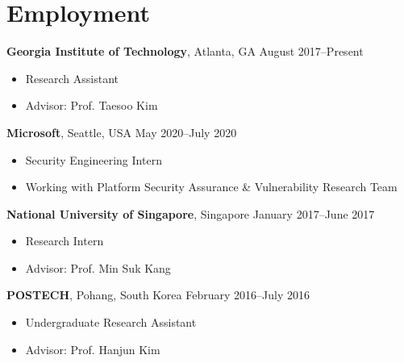 \section*{Employment}

\begin{description}
\item {\bf Georgia Institute of Technology}, Atlanta, GA \dotfill August 2017--Present
  \begin{itemize}
  \item Research Assistant
  \item Advisor: Prof. Taesoo Kim
  \end{itemize}

\item {\bf Microsoft}, Seattle, USA \dotfill May 2020--July 2020
  \begin{itemize}
      \item Security Engineering Intern
      \item Working with Platform Security Assurance \& Vulnerability Research Team
  \end{itemize}

  
\item {\bf National University of Singapore}, Singapore \dotfill January 2017--June 2017
  \begin{itemize}
  \item Research Intern
  \item Advisor: Prof. Min Suk Kang
  \end{itemize}

\item {\bf POSTECH}, Pohang, South Korea \dotfill February 2016--July 2016
  \begin{itemize}
  \item Undergraduate Research Assistant
  \item Advisor: Prof. Hanjun Kim
  \end{itemize}
\end{description}
